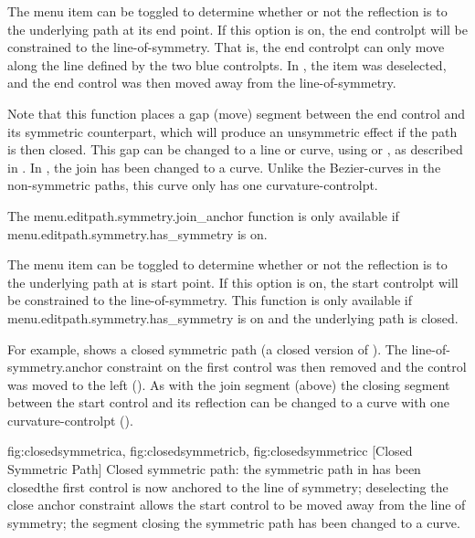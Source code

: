 
The  menu item can be toggled to
determine whether or not the reflection is
 to the underlying
path at its end point. If this option is on, the end \gls{controlpt}
will be constrained to the \gls{line-of-symmetry}.  That is, the end
\gls{controlpt} can only move along the line defined by the two blue
\glspl*{controlpt}.  In , the
 item was deselected, and the
end control was then moved away from the \gls{line-of-symmetry}.

Note that this function places a \gls{gap} (move) segment between the
end control and its symmetric counterpart, which will produce an
unsymmetric effect if the path is then closed. This gap can be changed to
a line or curve, using  or
, as described in
. In ,
the join has been changed to a curve. Unlike the \glspl{Bezier-curve}
in the non-symmetric paths, this curve only has one 
\gls{curvature-controlpt}.

The \gls{menu.editpath.symmetry.join_anchor} function is only available
if \gls{menu.editpath.symmetry.has_symmetry} is on.


The  menu item can be toggled
to determine whether or not the reflection is
 to the
underlying path at is start point.  If this option is on, the start
\gls{controlpt} will be constrained to the \gls{line-of-symmetry}.  This
function is only available if
\gls{menu.editpath.symmetry.has_symmetry} is on and the
underlying \gls{path} is closed.

For example,  shows a closed
symmetric path (a closed version of ). The
\gls{line-of-symmetry.anchor} constraint on the first control was
then removed and the control was moved to the left
(). As with the join segment (above)
the closing segment between the start control and its reflection can
be changed to a curve with one \gls{curvature-controlpt}
().

{
 {fig:closedsymmetrica}{}{},
 {fig:closedsymmetricb}{}{},
 {fig:closedsymmetricc}{}{}
}
[Closed Symmetric Path]
{Closed symmetric path:  the symmetric path in
 has been closed\dash the
first control is now anchored to the line of symmetry;
 deselecting the close anchor constraint allows
the start control to be moved away from the line of symmetry;
 the segment closing the symmetric path has been
changed to a curve.}

